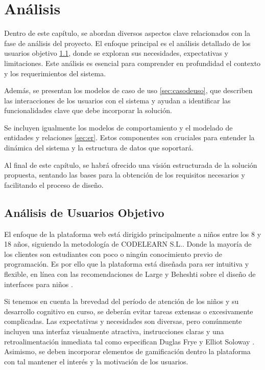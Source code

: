 \chapter{Análisis} \label{chap:analisis}

Dentro de este capítulo, se abordan diversos aspectos clave relacionados con la fase de análisis del proyecto. El enfoque principal es el análisis detallado de los usuarios objetivo \ref{sec:usuariosobjetivos}, donde se exploran sus necesidades, expectativas y limitaciones. Este análisis es esencial para comprender en profundidad el contexto y los requerimientos del sistema.

Además, se presentan los modelos de caso de uso \ref{sec:casodeuso}, que describen las interacciones de los usuarios con el sistema y ayudan a identificar las funcionalidades clave que debe incorporar la solución. 

Se incluyen igualmente los modelos de comportamiento y el modelado de entidades y relaciones \ref{sec:er}. Estos componentes son cruciales para entender la dinámica del sistema y la estructura de datos que soportará.

Al final de este capítulo, se habrá ofrecido una visión estructurada de la solución propuesta, sentando las bases para la obtención de los requisitos necesarios y facilitando el proceso de diseño.

\section{Análisis de Usuarios Objetivo} \label{sec:usuariosobjetivos}

El enfoque de la plataforma web está dirigido principalmente a niños entre los 8 y 18 años, siguiendo la metodología de CODELEARN S.L.. Donde la mayoría de los clientes son estudiantes con poco o ningún conocimiento previo de programación. Es por ello que la plataforma está diseñada para ser intuitiva y flexible, en línea con las recomendaciones de Large y Beheshti sobre el diseño de interfaces para niños \cite{large2005}.

Si tenemos en cuenta la brevedad del período de atención de los niños y su desarrollo cognitivo en curso, se deberán evitar tareas extensas o excesivamente complicadas. Las expectativas y necesidades son diversas, pero comúnmente incluyen una interfaz visualmente atractiva, instrucciones claras y una retroalimentación inmediata tal como especifican Duglas Frye y Elliot Soloway \cite{interfacedesign}. Asimismo, se deben incorporar elementos de gamificación dentro la plataforma con tal mantener el interés y la motivación de los usuarios. 


